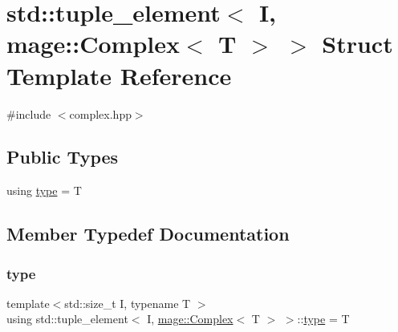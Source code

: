 \hypertarget{structstd_1_1tuple__element_3_01_i_00_01mage_1_1_complex_3_01_t_01_4_01_4}{}\section{std\+:\+:tuple\+\_\+element$<$ I, mage\+:\+:Complex$<$ T $>$ $>$ Struct Template Reference}
\label{structstd_1_1tuple__element_3_01_i_00_01mage_1_1_complex_3_01_t_01_4_01_4}


{\ttfamily \#include $<$complex.\+hpp$>$}

\subsection*{Public Types}
\begin{DoxyCompactItemize}
\item 
using \mbox{\hyperlink{structstd_1_1tuple__element_3_01_i_00_01mage_1_1_complex_3_01_t_01_4_01_4_af3c7d1f31b171e9cbbf0f4f0a248a862}{type}} = T
\end{DoxyCompactItemize}


\subsection{Member Typedef Documentation}
\mbox{\label{structstd_1_1tuple__element_3_01_i_00_01mage_1_1_complex_3_01_t_01_4_01_4_af3c7d1f31b171e9cbbf0f4f0a248a862}} 
\subsubsection{\texorpdfstring{type}{type}}
{\footnotesize\ttfamily template$<$std\+::size\+\_\+t I, typename T $>$ \\
using std\+::tuple\+\_\+element$<$ I, \mbox{\hyperlink{structmage_1_1_complex}{mage\+::\+Complex}}$<$ T $>$ $>$\+::\mbox{\hyperlink{structstd_1_1tuple__element_3_01_i_00_01mage_1_1_complex_3_01_t_01_4_01_4_af3c7d1f31b171e9cbbf0f4f0a248a862}{type}} =  T}

